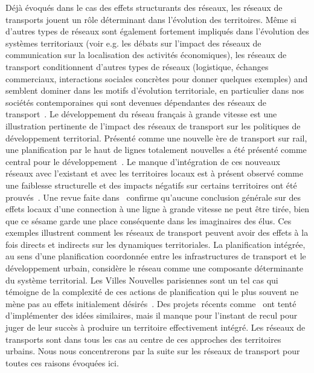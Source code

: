 {Déjà évoqués dans le cas des effets structurants des réseaux, les réseaux de transports jouent un rôle déterminant dans l'évolution des territoires. Même si d'autres types de réseaux sont également fortement impliqués dans l'évolution des systèmes territoriaux (voir e.g. les débats sur l'impact des réseaux de communication sur la localisation des activités économiques), les réseaux de transport conditionnent d'autres types de réseaux (logistique, échanges commerciaux, interactions sociales concrètes pour donner quelques exemples) and semblent dominer dans les motifs d'évolution territoriale, en particulier dans nos sociétés contemporaines qui sont devenues dépendantes des réseaux de transport~\cite{bavoux2005geographie}. Le développement du réseau français à grande vitesse est une illustration pertinente de l'impact des réseaux de transport sur les politiques de développement territorial. Présenté comme une nouvelle ère de transport sur rail, une planification par le haut de lignes totalement nouvelles a été présenté comme central pour le développement~\cite{zembri1997fondements}. Le manque d'intégration de ces nouveaux réseaux avec l'existant et avec les territoires locaux est à présent observé comme une faiblesse structurelle et des impacts négatifs sur certains territoires ont été prouvés~\cite{zembri2008contribution}. Une revue faite dans~\cite{bazin2011grande} confirme qu'aucune conclusion générale sur des effets locaux d'une connection à une ligne à grande vitesse ne peut être tirée, bien que ce sésame garde une place conséquente dans les imaginaires des élus. Ces exemples illustrent comment les réseaux de transport peuvent avoir des effets à la fois directs et indirects sur les dynamiques territoriales. La planification intégrée, au sens d'une planification coordonnée entre les infrastructures de transport et le développement urbain, considère le réseau comme une composante déterminante du système territorial. %
Les Villes Nouvelles parisiennes sont un tel cas qui témoigne de la complexité de ces actions de planification qui le plus souvent ne mène pas au effets initialement désirés~\cite{es119}. Des projets récents comme~\cite{l2012ville} ont tenté d'implémenter des idées similaires, mais il manque pour l'instant de recul pour juger de leur succès à produire un territoire effectivement intégré. Les réseaux de transports sont dans tous les cas au centre de ces approches des territoires urbains. Nous nous concentrerons par la suite sur les réseaux de transport pour toutes ces raisons évoquées ici.
}




